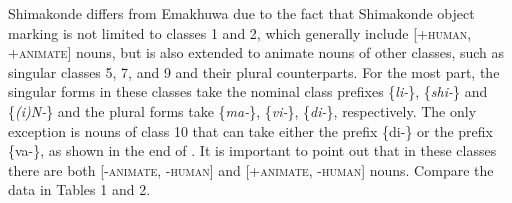\documentclass[output=paper]{langsci/langscibook}
\begin{document}
{Shimakonde differs from Emakhuwa due to the fact that Shimakonde object marking is not limited to classes 1 and 2, which generally include [+}{\textsc{human}}{, +}{\textsc{animate}}{] nouns, but is also extended to animate nouns of other classes, such as singular classes 5, 7, and 9 and their plural counterparts.} {For the most part, }{the singular forms in these classes take the nominal class prefixes \{}{\textit{li-}}{\}, \{}{\textit{shi-}}{\} and \{}{\textit{(i)N-}}{\} and the plural forms take \{}{\textit{ma-}}{\}, \{}{\textit{vi-}}{\}, \{}{\textit{di-}}{\}, respectively. The only exception is nouns of class 10 that can take either the prefix \{di-\} or the prefix \{va-\}, as shown in the end of . }{It is important to point out that} {in these classes there are both [-}{\textsc{animate, -human}}{] and [+}{\textsc{animate, -human}}{] nouns. Compare the data in Tables 1 and 2.}
\end{document}
